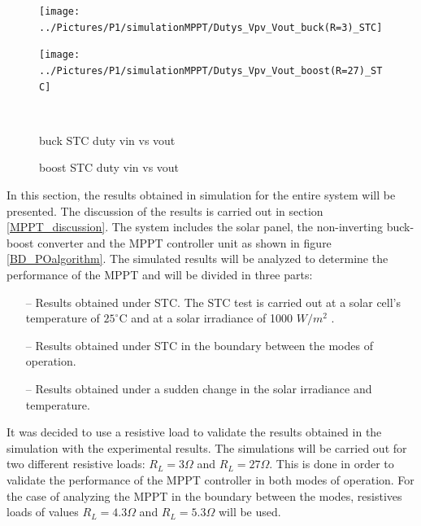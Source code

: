 \begin{figure}[H]
	\begin{minipage}[c]{0.6\textwidth}
		\centering
		\texttt{[image: ../Pictures/P1/simulationMPPT/Dutys\_Vpv\_Vout\_buck(R=3)\_STC]} %
	\end{minipage}%
	\hfill
	\begin{minipage}[c]{0.6\textwidth}
		\centering
		\texttt{[image: ../Pictures/P1/simulationMPPT/Dutys\_Vpv\_Vout\_boost(R=27)\_STC]} %
	\end{minipage} \\ %
	\begin{minipage}[t]{0.6\textwidth}
		\caption{buck STC duty vin vs vout} %
	\end{minipage}%
	\hfill
	\begin{minipage}[t]{0.6\textwidth}
		\caption{boost STC duty vin vs vout} %
	\end{minipage}
\end{figure}
\fi 

In this section, the results obtained in simulation for the entire system will be presented. The discussion of the results is carried out in section \ref{MPPT_discussion}. The system includes the solar panel, the non-inverting buck-boost converter and the MPPT controller unit as shown in figure \ref{BD_POalgorithm}. The simulated results will be analyzed to determine the performance of the MPPT and will be divided in three parts: 
\begin{itemize}
	\item[--] Results obtained under STC. The STC test is carried out at a solar cell's temperature of $25^\circ$C and at a solar irradiance of 1000 $W/ m^2$ \cite{handbook}.
	\item[--] Results obtained under STC in the boundary between the modes of operation.
	\item[--] Results obtained under a sudden change in the solar irradiance and temperature.
\end{itemize}

It was decided to use a resistive load to validate the results obtained in the simulation with the experimental results. The simulations will be carried out for two different resistive loads: $R_{L}=3\Omega$ and $R_{L}=27\Omega$. This is done in order to validate the performance of the MPPT controller in both modes of operation. For the case of analyzing the MPPT in the boundary between the modes, resistives loads of values $R_{L}=4.3\Omega$ and $R_{L}=5.3\Omega$ will be used.
 
